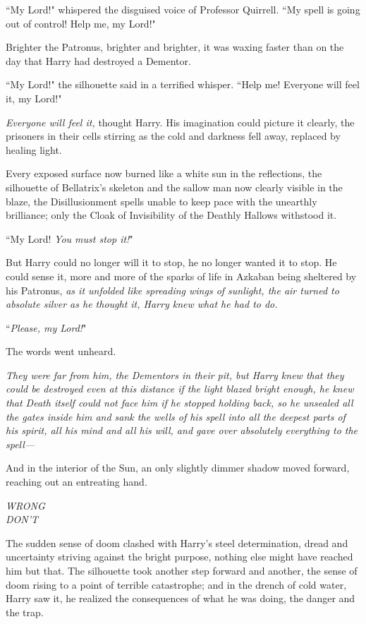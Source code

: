 ``My Lord!" whispered the disguised voice of Professor Quirrell. ``My spell is going out of control! Help me, my Lord!"

Brighter the Patronus, brighter and brighter, it was waxing faster than on the day that Harry had destroyed a Dementor.

``My Lord!" the silhouette said in a terrified whisper. ``Help me! Everyone will feel it, my Lord!"

\emph{Everyone will feel it,} thought Harry. His imagination could picture it clearly, the prisoners in their cells stirring as the cold and darkness fell away, replaced by healing light.

Every exposed surface now burned like a white sun in the reflections, the silhouette of Bellatrix's skeleton and the sallow man now clearly visible in the blaze, the Disillusionment spells unable to keep pace with the unearthly brilliance; only the Cloak of Invisibility of the Deathly Hallows withstood it.

``My Lord! \emph{You must stop it!}"

But Harry could no longer will it to stop, he no longer wanted it to stop. He could sense it, more and more of the sparks of life in Azkaban being sheltered by his Patronus, \emph{as it unfolded like spreading wings of sunlight, the air turned to absolute silver as he thought it, Harry knew what he had to do.}

``\emph{Please, my Lord!}"

The words went unheard.

\emph{They were far from him, the Dementors in their pit, but Harry knew that they could be destroyed even at this distance if the light blazed bright enough, he knew that Death itself could not face him if he stopped holding back, so he unsealed all the gates inside him and sank the wells of his spell into all the deepest parts of his spirit, all his mind and all his will, and gave over absolutely everything to the spell---}

And in the interior of the Sun, an only slightly dimmer shadow moved forward, reaching out an entreating hand.

\emph{WRONG\\
DON'T}

The sudden sense of doom clashed with Harry's steel determination, dread and uncertainty striving against the bright purpose, nothing else might have reached him but that. The silhouette took another step forward and another, the sense of doom rising to a point of terrible catastrophe; and in the drench of cold water, Harry saw it, he realized the consequences of what he was doing, the danger and the trap.

